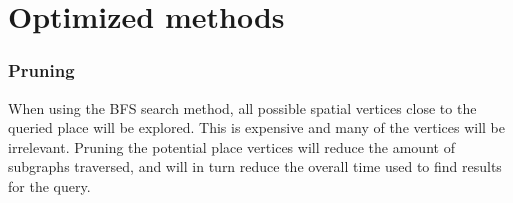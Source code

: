
\chapter{Optimized methods}

\subsection{Pruning}
When using the BFS search method, all possible spatial vertices close to the queried place will be explored. This is expensive and many of the vertices will be irrelevant. Pruning the potential place vertices will reduce the amount of subgraphs traversed, and will in turn reduce the overall time used to find results for the query.

\cleardoublepage